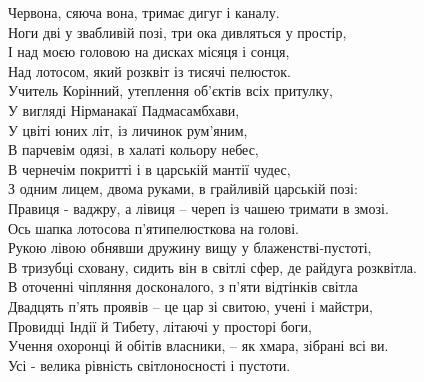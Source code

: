 Червона, сяюча вона, тримає дигуг і каналу.\\
Ноги дві у звабливій позі, три ока дивляться у простір,\\
І над моєю головою на дисках місяця і сонця,\\
Над лотосом, який розквіт із тисячі пелюсток.\\
Учитель Корінний, утеплення об'єктів всіх притулку,\\
У вигляді Нірманакаї Падмасамбхави,\\
У цвіті юних літ, із личинок рум'яним,\\
В парчевім одязі, в халаті кольору небес,\\
В чернечім покритті і в царській мантії чудес,\\
З одним лицем, двома руками, в грайливій царській позі:\\
Правиця - ваджру, а лівиця -- череп із чашею тримати в змозі.\\
Ось шапка лотосова п'ятипелюсткова на голові.\\
Рукою лівою обнявши дружину вищу у блаженстві-пустоті,\\
В тризубці сховану, сидить він в світлі сфер, де райдуга розквітла.\\
В оточенні чіпляння досконалого, з п'яти відтінків світла\\
Двадцять п'ять проявів -- це цар зі свитою, учені і майстри,\\
Провидці Індії й Тибету, літаючі у просторі боги,\\
Учення охоронці й обітів власники, -- як хмара, зібрані всі ви.\\
Усі - велика рівність світлоносності і пустоти.\\

\newpage
